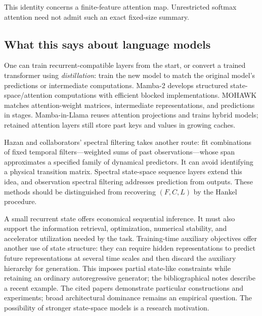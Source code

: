 \documentclass[11pt,twoside]{article}
\theoremstyle{definition}
\theoremstyle{remark}
\begin{document}
This identity concerns a finite-feature attention map.
Unrestricted softmax attention need not admit such an exact fixed-size
summary.

\subsection{What this says about language models}

One can train recurrent-compatible layers from the start, or convert a
trained transformer using \emph{distillation}: train the new model to
match the original model's predictions or intermediate computations.
Mamba-2 develops structured state-space/attention computations with
efficient blocked implementations. MOHAWK matches attention-weight matrices,
intermediate representations, and predictions in stages.
Mamba-in-Llama reuses attention projections and trains hybrid models;
retained attention layers still store past keys and values in growing caches.

Hazan and collaborators' spectral filtering takes another route:
fit combinations of fixed temporal filters---weighted sums of past
observations---whose span approximates a
specified family of dynamical predictors. It can avoid identifying
a physical transition matrix. Spectral state-space sequence layers extend
this idea, and observation spectral filtering addresses prediction from
outputs. These methods should be distinguished from recovering
\((F,C,L)\) by the Hankel procedure.

A small recurrent state offers economical sequential inference.
It must also support the information retrieval, optimization, numerical
stability, and accelerator utilization needed by the task.
Training-time auxiliary objectives offer another use of state structure:
they can require hidden representations to predict future representations
at several time scales and then discard the auxiliary hierarchy for
generation. This imposes partial state-like constraints while retaining an
ordinary autoregressive generator; the bibliographical notes describe a
recent example.
The cited papers
demonstrate particular constructions and experiments; broad architectural
dominance remains an empirical question. The possibility of stronger
state-space models is a research motivation.
\end{document}
